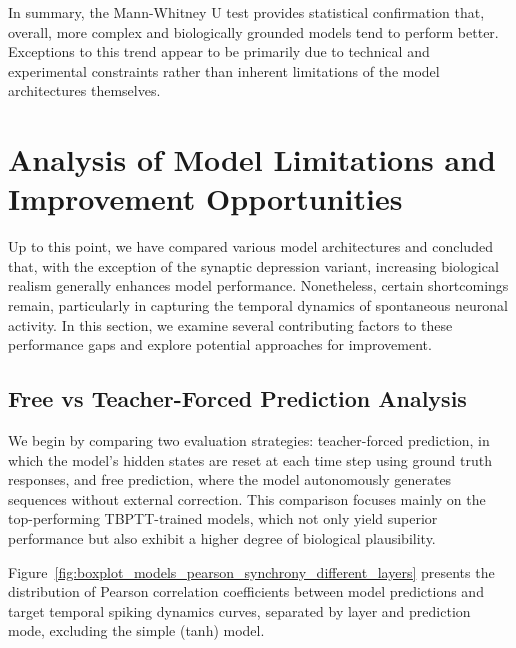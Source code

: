 In summary, the Mann-Whitney U test provides statistical confirmation that, overall, more complex and biologically grounded models tend to perform better. Exceptions to this trend appear to be primarily due to technical and experimental constraints rather than inherent limitations of the model architectures themselves.

\section{Analysis of Model Limitations and Improvement Opportunities}
\label{sec:performace_gaps_and_opportunities_for_improvement}

Up to this point, we have compared various model architectures and concluded that, with the exception of the synaptic depression variant, increasing biological realism generally enhances model performance. Nonetheless, certain shortcomings remain, particularly in capturing the temporal dynamics of spontaneous neuronal activity. In this section, we examine several contributing factors to these performance gaps and explore potential approaches for improvement.

\subsection{Free vs Teacher-Forced Prediction Analysis}
\label{{subsec:free_vs_teacher_forced_predictions}}

We begin by comparing two evaluation strategies: teacher-forced prediction, in which the model's hidden states are reset at each time step using ground truth responses, and free prediction, where the model autonomously generates sequences without external correction. This comparison focuses mainly on the top-performing TBPTT-trained models, which not only yield superior performance but also exhibit a higher degree of biological plausibility.

Figure~\ref{fig:boxplot_models_pearson_synchrony_different_layers} presents the distribution of Pearson correlation coefficients between model predictions and target temporal spiking dynamics curves, separated by layer and prediction mode, excluding the simple (tanh) model.

